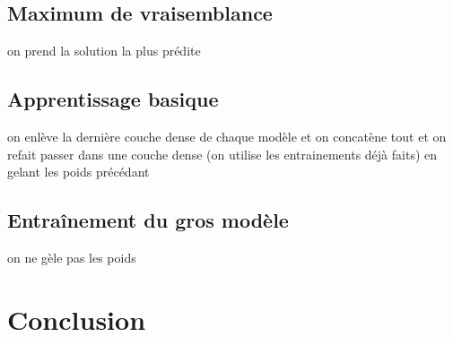 \documentclass[a4paper]{article}
\begin{document}
\subsection{Maximum de vraisemblance}
on prend la solution la plus prédite

\subsection{Apprentissage basique}
on enlève la dernière couche dense de chaque modèle et on concatène tout et on refait passer dans une couche dense
(on utilise les entrainements déjà faits) en gelant les poids précédant

\subsection{Entraînement du gros modèle}
on ne gèle pas les poids

\section{Conclusion}
\end{document}
